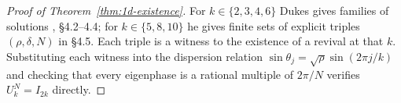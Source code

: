 \begin{proof}[Proof of Theorem~\ref{thm:1d-existence}]
For $k \in \{2, 3, 4, 6\}$ Dukes gives families of solutions
\cite{Dukes2014}, \S4.2--4.4; for $k \in \{5, 8, 10\}$ he gives finite
sets of explicit triples $(\rho, \delta, N)$ in \S4.5. Each triple is
a witness to the existence of a revival at that $k$. Substituting each
witness into the dispersion relation
$\sin\theta_j = \sqrt{\rho}\sin(2\pi j/k)$ and checking that every
eigenphase is a rational multiple of $2\pi/N$ verifies
$U_k^N = I_{2k}$ directly.
\end{proof}

